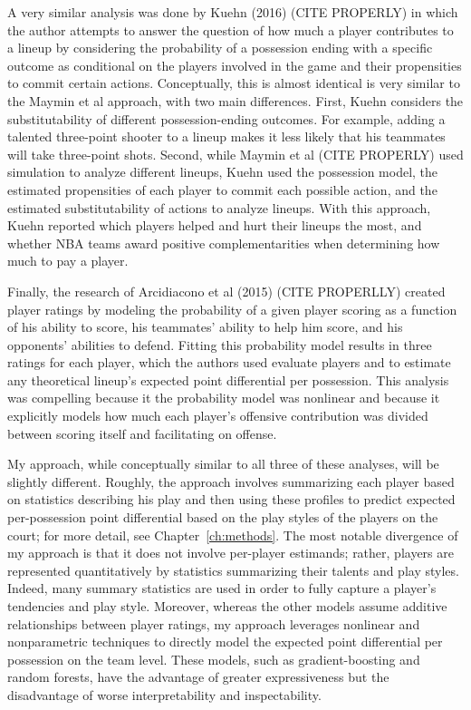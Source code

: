 A very similar analysis was done by Kuehn (2016) (CITE PROPERLY) in which the author
attempts to answer the question of how much a player contributes to a lineup by
considering the probability of a possession ending with a specific outcome as
conditional on the players involved in the game and their propensities to commit
certain actions.  Conceptually, this is almost identical is very similar to the
Maymin et al approach, with two main differences. First, Kuehn considers the
substitutability of different possession-ending outcomes. For example, adding a
talented three-point shooter to a lineup makes it less likely that his teammates
will take three-point shots. Second, while Maymin et al (CITE PROPERLY) used
simulation to analyze different lineups, Kuehn used the possession model, the
estimated propensities of each player to commit each possible action, and the
estimated substitutability of actions to analyze lineups. With this approach, Kuehn
reported which players helped and hurt their lineups the most, and whether NBA teams
award positive complementarities when determining how much to pay a player.

Finally, the research of Arcidiacono et al (2015) (CITE PROPERLLY) created player
ratings by modeling the probability of a given player scoring as a function of his
ability to score, his teammates' ability to help him score, and his opponents'
abilities to defend.  Fitting this probability model results in three ratings for
each player, which the authors used evaluate players and to estimate any theoretical
lineup's expected point differential per possession. This analysis was compelling
because it the probability model was nonlinear and because it explicitly models how
much each player's offensive contribution was divided between scoring itself and
facilitating on offense.

My approach, while conceptually similar to all three of these analyses, will be
slightly different. Roughly, the approach involves summarizing each player based on
statistics describing his play and then using these profiles to predict expected
per-possession point differential based on the play styles of the players on the
court; for more detail, see Chapter~\ref{ch:methods}. The most notable divergence of
my approach is that it does not involve per-player estimands; rather, players are
represented quantitatively by statistics summarizing their talents and play styles.
Indeed, many summary statistics are used in order to fully capture a player's
tendencies and play style. Moreover, whereas the other models assume additive
relationships between player ratings, my approach leverages nonlinear and
nonparametric techniques to directly model the expected point differential per
possession on the team level. These models, such as gradient-boosting and random
forests, have the advantage of greater expressiveness but the disadvantage of worse
interpretability and inspectability.

